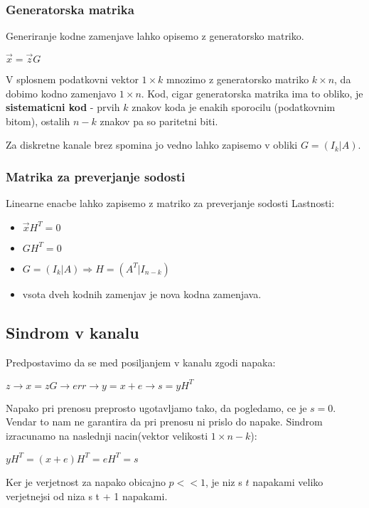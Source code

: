 \documentclass{article}
\begin{document}
\begin{multicols}{4}
\subsubsection{Generatorska matrika}
Generiranje kodne zamenjave lahko opisemo z generatorsko matriko.

\begin{center}
    \begin{math}
        \vec{x} = \vec{z}G
    \end{math}
\end{center}

V splosnem podatkovni vektor $1 \times k$ mnozimo z generatorsko matriko $k \times n$, da dobimo kodno zamenjavo
$1 \times n$. Kod, cigar generatorska matrika ima to obliko, je
\textbf{sistematicni kod} - prvih $k$ znakov koda je enakih sporocilu (podatkovnim bitom), ostalih $n-k$ znakov pa so
paritetni biti.

Za diskretne kanale brez spomina jo vedno lahko zapisemo v obliki $G = (I_k | A)$.

\subsubsection{Matrika za preverjanje sodosti}
Linearne enacbe lahko zapisemo z matriko za preverjanje sodosti
Lastnosti:
\begin{itemize}
    \item $\vec{x}H^T = 0$
    \item $GH^T = 0$
    \item $G = (I_k | A) \Rightarrow H = (A^T | I_{n-k})$
    \item vsota dveh kodnih zamenjav je nova kodna zamenjava.
\end{itemize}

\subsection{Sindrom v kanalu}
Predpostavimo da se med posiljanjem v kanalu zgodi napaka:
\begin{center}
    \begin{math}
        z \rightarrow x = zG \rightarrow err\rightarrow y = x + e \rightarrow s = yH^T
    \end{math}
\end{center}
Napako pri prenosu preprosto ugotavljamo tako, da pogledamo, ce je $s = 0$. Vendar to nam ne garantira da pri prenosu ni prislo do napake.
Sindrom izracunamo na naslednji nacin(vektor velikosti $1 \times n - k$):
\begin{center}
    \begin{math}
        yH^T = (x + e)H^T = eH^T = s
    \end{math}
\end{center}
Ker je verjetnost za napako obicajno $p << 1$, je niz s $t$ napakami veliko
verjetnejsi od niza s t + 1 napakami.


\end{multicols}
\end{document}
